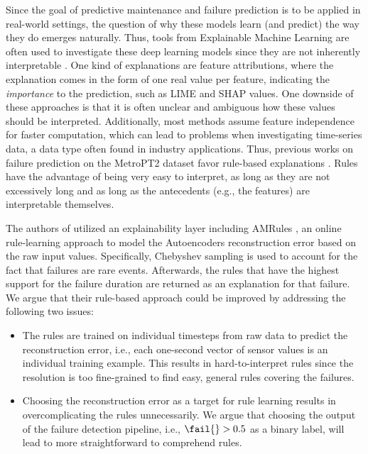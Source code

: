 Since the goal of predictive maintenance and failure prediction is to be applied in real-world settings, the question of why these models learn (and predict) the way they do emerges naturally.
Thus, tools from Explainable Machine Learning are often used to investigate these deep learning models since they are not inherently interpretable \cite{rudinStopExplainingBlack2019}.
One kind of explanations are feature attributions, where the explanation comes in the form of one real value per feature, indicating the \textit{importance} to the prediction, such as LIME \cite{ribeiroWhyShouldTrust2016} and SHAP \cite{lundbergUnifiedApproachInterpreting2017} values.
One downside of these approaches is that it is often unclear and ambiguous how these values should be interpreted.
Additionally, most methods assume feature independence for faster computation, which can lead to problems when investigating time-series data, a data type often found in industry applications.
Thus, previous works on failure prediction on the MetroPT2 dataset favor rule-based explanations \cite{silva2023predictive,gamaFaultDetectionAnomaly2024}.
Rules have the advantage of being very easy to interpret, as long as they are not excessively long and as long as the antecedents (e.g., the features) are interpretable themselves.

The authors of \cite{silva2023predictive,gamaFaultDetectionAnomaly2024} utilized an explainability layer including AMRules \cite{duarteAdaptiveModelRules2016,ribeiroOnlineAnomalyExplanation2023}, an online rule-learning approach to model the Autoencoders reconstruction error based on the raw input values.
Specifically, Chebyshev sampling \cite{aminianChebyshevApproachesImbalanced2021} is used to account for the fact that failures are rare events.
Afterwards, the rules that have the highest support for the failure duration are returned as an explanation for that failure.
We argue that their rule-based approach could be improved by addressing the following two issues:
\begin{itemize}
    \item The rules are trained on individual timesteps from raw data to predict the reconstruction error, i.e., each one-second vector of sensor values is an individual training example. This results in hard-to-interpret rules since the resolution is too fine-grained to find easy, general rules covering the failures.
    \item Choosing the reconstruction error as a target for rule learning results in overcomplicating the rules unnecessarily. We argue that choosing the output of the failure detection pipeline, i.e., $ \fail{} > 0.5 $ as a binary label, will lead to more straightforward to comprehend rules.
\end{itemize}